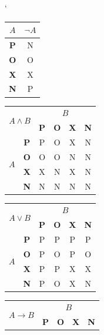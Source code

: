 \documentclass[a4paper, 11pt]{article}
\begin{document}
    \begin{table}[h]
        \centering
        \catcode`
        \begin{tabular}{|c|c|}
            \hline
            $A$ & $\neg{A}$ \\ \hline
            \textbf{P} & N \\ \hline
            \textbf{O} & O \\ \hline
            \textbf{X} & X \\ \hline
            \textbf{N} & P \\ \hline
        \end{tabular}
        \begin{tabular}{|c|c|c|c|c|c|}
            \hline
            \multicolumn{2}{|c|}{\multirow{2}{*}{$A \wedge B$}} & \multicolumn{4}{c|}{$B$} \\ \cline{3-6}
            \multicolumn{2}{|c|}{} & \textbf{P} & \textbf{O} & \textbf{X} & \textbf{N} \\ \hline
            \multirow{4}{*}{$A$} & \textbf{P} & P & O & X & N \\ \cline{2-6} 
             & \textbf{O} & O & O & N & N \\ \cline{2-6} 
             & \textbf{X} & X & N & X & N \\ \cline{2-6} 
             & \textbf{N} & N & N & N & N \\ \hline
        \end{tabular}
        \begin{tabular}{|c|c|c|c|c|c|}
            \hline
            \multicolumn{2}{|c|}{\multirow{2}{*}{$A \vee B$}} & \multicolumn{4}{c|}{$B$} \\ \cline{3-6} 
            \multicolumn{2}{|c|}{} & \textbf{P} & \textbf{O} & \textbf{X} & \textbf{N} \\ \hline
            \multirow{4}{*}{$A$} & \textbf{P} & P & P & P & P \\ \cline{2-6} 
             & \textbf{O} & P & O & P & O \\ \cline{2-6} 
             & \textbf{X} & P & P & X & X \\ \cline{2-6} 
             & \textbf{N} & P & O & X & N \\ \hline
        \end{tabular}
        \begin{tabular}{|c|c|c|c|c|c|}
            \hline
            \multicolumn{2}{|c|}{\multirow{2}{*}{$A \rightarrow B$}} & \multicolumn{4}{c|}{$B$} \\ \cline{3-6}
            \multicolumn{2}{|c|}{} & \textbf{P} & \textbf{O} & \textbf{X} & \textbf{N} \\ \hline

\end{tabular}
\end{table}
\end{document}
